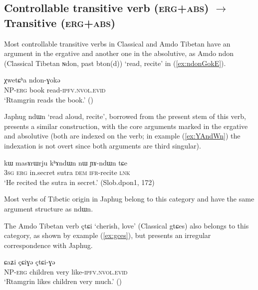 \documentclass[oldfontcommands,oneside,a4paper,11pt]{article}
\newcommand{\ipa}[1]{{\phon \mbox{#1}}} %
\newcommand{\refb}[1]{(\ref{#1})}
\begin{document}
\subsection{Controllable transitive verb (\textsc{erg+abs})  $\rightarrow$ Transitive (\textsc{erg+abs})}
Most controllable transitive verbs in Classical and Amdo Tibetan have an argument in the ergative and another one in the absolutive, as Amdo \ipa{ndon} (Classical Tibetan \ipa{ɴdon}, past \ipa{bton(d)}) `read, recite' in \refb{ex:ndonGokE}.


\begin{exe}
\ex \label{ex:ndonGokE}
\gll \ipa{ʂtamɖʐən-ɣə}  \ipa{χwetɕʰa}  \ipa{ndon-ɣokə} \\
NP-\textsc{erg} book read-\textsc{ipfv.nvol.evid} \\
\glt `Rtamgrin reads the book.' (\citealt[94, ex. 265]{haller04themchen})
\end{exe}


Japhug \ipa{ndɯn} `read aloud, recite', borrowed from the present stem of this verb, presents a similar construction, with the core arguments marked in the ergative and absolutive (both are indexed on the verb; in example \refb{ex:YAndWn} the indexation is not overt since both arguments are third singular).

\begin{exe}
\ex \label{ex:YAndWn}
\gll \ipa{ɯʑo} 	\ipa{kɯ} 	\ipa{masɤrɯrju} 	\ipa{kʰɤndɯn} 	\ipa{nɯ} 	\ipa{ɲɤ-ndɯn} 	\ipa{tɕe} \\
\textsc{3sg} \textsc{erg} in.secret sutra \textsc{dem} \textsc{ifr}-recite \textsc{lnk} \\
\glt `He recited the sutra in secret.' (Slob.dpon1, 172)
\end{exe}

Most verbs of Tibetic origin in Japhug belong to this category and have the same argument structure as \ipa{ndɯn}. 

The Amdo Tibetan verb \ipa{çtɕi} `cherish, love' (Classical \ipa{gtɕes}) also belongs to this category, as shown by example \refb{ex:gces}, but presents an irregular correspondence with Japhug.

\begin{exe}
\ex \label{ex:gces}
\gll \ipa{ʂtamɖʐən-ɣə}  \ipa{ɕaʑi} \ipa{çɕiɣə}  \ipa{çtɕi-ɣə} \\
NP-\textsc{erg} children very like-\textsc{ipfv.nvol.evid} \\
\glt `Rtamgrin likes children very much.' (\citealt[86, ex:186]{haller04themchen})
\end{exe}
\end{document}
